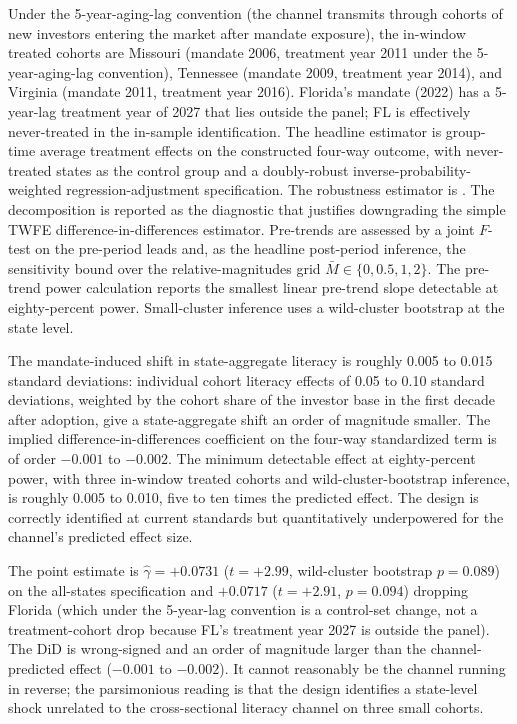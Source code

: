 \documentclass[12pt]{article}
\begin{document}
Under the 5-year-aging-lag convention (the channel transmits through cohorts of new investors entering the market after mandate exposure), the in-window treated cohorts are Missouri (mandate 2006, treatment year 2011 under the 5-year-aging-lag convention), Tennessee (mandate 2009, treatment year 2014), and Virginia (mandate 2011, treatment year 2016). Florida's mandate (2022) has a 5-year-lag treatment year of 2027 that lies outside the panel; FL is effectively never-treated in the in-sample identification. The headline estimator is \citet{callawaySantanna2021} group-time average treatment effects on the constructed four-way outcome, with never-treated states as the control group and a doubly-robust inverse-probability-weighted regression-adjustment specification. The robustness estimator is \citet{sunAbraham2021}. The \citet{goodmanBacon2021} decomposition is reported as the diagnostic that justifies downgrading the simple TWFE difference-in-differences estimator. Pre-trends are assessed by a joint $F$-test on the \citet{sunAbraham2021} pre-period leads and, as the headline post-period inference, the \citet{rambachanRoth2023} sensitivity bound over the relative-magnitudes grid $\bar M \in \{0, 0.5, 1, 2\}$. The \citet{roth2022} pre-trend power calculation reports the smallest linear pre-trend slope detectable at eighty-percent power. Small-cluster inference uses a wild-cluster bootstrap at the state level.

The mandate-induced shift in state-aggregate literacy is roughly 0.005 to 0.015 standard deviations: individual cohort literacy effects of 0.05 to 0.10 standard deviations, weighted by the cohort share of the investor base in the first decade after adoption, give a state-aggregate shift an order of magnitude smaller. The implied difference-in-differences coefficient on the four-way standardized term is of order $-0.001$ to $-0.002$. The minimum detectable effect at eighty-percent power, with three in-window treated cohorts and wild-cluster-bootstrap inference, is roughly 0.005 to 0.010, five to ten times the predicted effect. The design is correctly identified at current standards but quantitatively underpowered for the channel's predicted effect size.

The point estimate is $\hat\gamma = +0.0731$ ($t = +2.99$, wild-cluster bootstrap $p = 0.089$) on the all-states specification and $+0.0717$ ($t = +2.91$, $p = 0.094$) dropping Florida (which under the 5-year-lag convention is a control-set change, not a treatment-cohort drop because FL's treatment year 2027 is outside the panel). The DiD is wrong-signed and an order of magnitude larger than the channel-predicted effect ($-0.001$ to $-0.002$). It cannot reasonably be the channel running in reverse; the parsimonious reading is that the design identifies a state-level shock unrelated to the cross-sectional literacy channel on three small cohorts.
\end{document}
